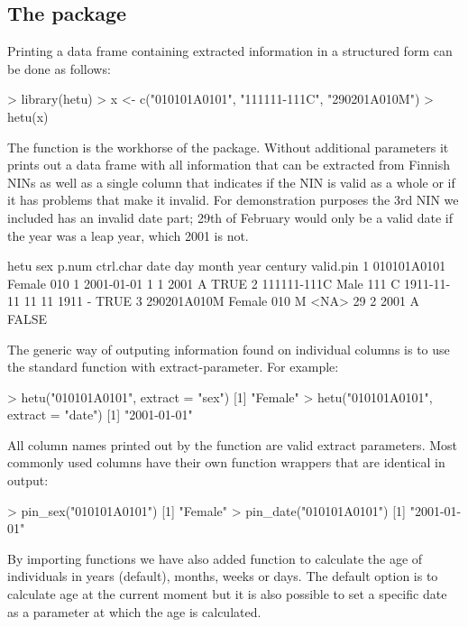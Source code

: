 \subsection{The  package}

Printing a data frame containing extracted information in a structured form can be done as follows:

\begin{example}
 > library(hetu)
 > x <- c("010101A0101", "111111-111C", "290201A010M")
 > hetu(x)
\end{example}

The  function is the workhorse of the  package. Without additional parameters it prints out a data frame with all information that can be extracted from Finnish NINs as well as a single column that indicates if the NIN is valid as a whole or if it has problems that make it invalid. For demonstration purposes the 3rd NIN we included has an invalid date part; 29th of February would only be a valid date if the year was a leap year, which 2001 is not.

\begin{example}
         hetu    sex p.num ctrl.char       date day month year century valid.pin
1 010101A0101 Female   010         1 2001-01-01   1     1 2001       A      TRUE
2 111111-111C   Male   111         C 1911-11-11  11    11 1911       -      TRUE
3 290201A010M Female   010         M       <NA>  29     2 2001       A     FALSE
\end{example}

The generic way of outputing information found on individual columns is to use the standard  function with extract-parameter. For example:

\begin{example}
  > hetu("010101A0101", extract = "sex")
  [1] "Female"
  > hetu("010101A0101", extract = "date")
  [1] "2001-01-01"
\end{example}

All column names printed out by the  function are valid extract parameters. Most commonly used columns have their own function wrappers that are identical in output:

\begin{example}
  > pin_sex("010101A0101")
  [1] "Female"
  > pin_date("010101A0101")
  [1] "2001-01-01"
\end{example}

By importing  \citep{lubridate} functions we have also added  function to calculate the age of individuals in years (default), months, weeks or days. The default option is to calculate age at the current moment but it is also possible to set a specific date as a parameter at which the age is calculated.

